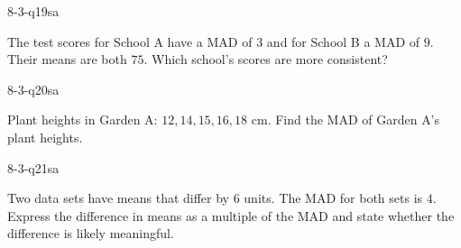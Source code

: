 \begin{practiceQuestion}{8-3-q19}{sa}
\begin{questionText}
The test scores for School A have a MAD of $3$ and for School B a MAD of $9$. Their means are both $75$. Which school's scores are more consistent?
\end{questionText}
\end{practiceQuestion}

\begin{practiceQuestion}{8-3-q20}{sa}
\begin{questionText}
Plant heights in Garden A: $12, 14, 15, 16, 18$ cm. Find the MAD of Garden A's plant heights.
\end{questionText}
\end{practiceQuestion}

\begin{practiceQuestion}{8-3-q21}{sa}
\begin{questionText}
Two data sets have means that differ by $6$ units. The MAD for both sets is $4$. Express the difference in means as a multiple of the MAD and state whether the difference is likely meaningful.
\end{questionText}
\end{practiceQuestion}



